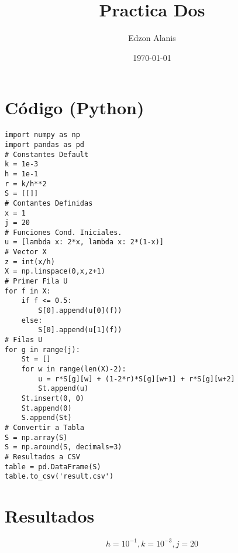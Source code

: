 \documentclass[12pt]{article}
\title{Practica Dos}
\author{Edzon Alanis}
\date{\today}
\begin{document}
\maketitle
{}
\section*{Código (Python)}
\begin{lstlisting}
import numpy as np
import pandas as pd
# Constantes Default
k = 1e-3
h = 1e-1
r = k/h**2
S = [[]]
# Contantes Definidas
x = 1
j = 20
# Funciones Cond. Iniciales.
u = [lambda x: 2*x, lambda x: 2*(1-x)]
# Vector X
z = int(x/h)
X = np.linspace(0,x,z+1)
# Primer Fila U
for f in X:
    if f <= 0.5:
        S[0].append(u[0](f))
    else:
        S[0].append(u[1](f))
# Filas U
for g in range(j):
    St = []
    for w in range(len(X)-2):
        u = r*S[g][w] + (1-2*r)*S[g][w+1] + r*S[g][w+2]
        St.append(u)
    St.insert(0, 0)
    St.append(0)
    S.append(St)
# Convertir a Tabla
S = np.array(S)
S = np.around(S, decimals=3)
# Resultados a CSV
table = pd.DataFrame(S)
table.to_csv('result.csv')
\end{lstlisting}
\section*{Resultados}
\[h = 10^{-1}, k = 10^{-3},j = 20\]
\begin{center}
\end{center}
\end{document}
